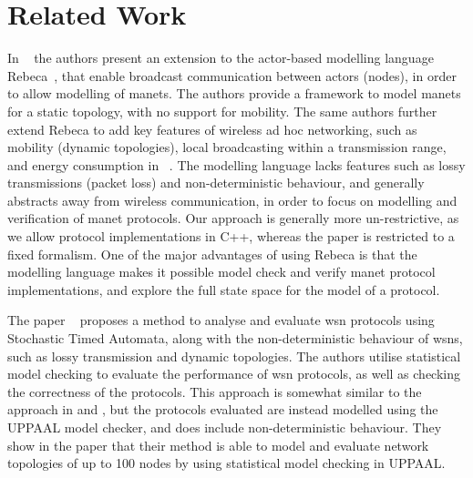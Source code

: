 \section{Related Work}\label{sec:relatedworks}



In ~\cite{DBLP:conf/fsen/YousefiGK15}
the authors present an extension to the actor-based modelling language Rebeca~\cite{Sirjani2004ModelingAV},
that enable broadcast communication between actors (nodes), in order to allow modelling of \gls{manet}s. The
authors provide a framework to model \gls{manet}s for a static topology, with no support for mobility. The
same authors further extend Rebeca to add key features of wireless ad hoc networking, such as mobility
(dynamic topologies), local broadcasting within a transmission range, and energy consumption in
~\cite{DBLP:journals/fac/YousefiGK17}. The modelling language lacks features such as lossy
transmissions (packet loss) and non-deterministic behaviour, and generally abstracts away from wireless
communication, in order to focus on modelling and verification of \gls{manet} protocols. Our approach is
generally more un-restrictive, as we allow protocol implementations in C++, whereas the paper is restricted to
a fixed formalism. One of the major advantages of using Rebeca is that the modelling language makes it
possible model check and verify \gls{manet} protocol implementations, and explore the full state space for the
model of a protocol.\medbreak

The paper ~\cite{article:maeofwsnpbsta} proposes a method to analyse and evaluate \gls{wsn} protocols using
Stochastic Timed Automata, along with the non-deterministic behaviour of \gls{wsn}s, such as lossy
transmission and dynamic topologies. The authors utilise statistical model checking to evaluate the
performance of \gls{wsn} protocols, as well as checking the correctness of the protocols. This approach is
somewhat similar to the approach in \cite{DBLP:conf/fsen/YousefiGK15} and
\cite{DBLP:journals/fac/YousefiGK17}, but the protocols evaluated are instead modelled using the UPPAAL model
checker, and does include non-deterministic behaviour. They show in the paper that their method is able to
model and evaluate network topologies of up to 100 nodes by using statistical model checking in UPPAAL.
\medbreak

